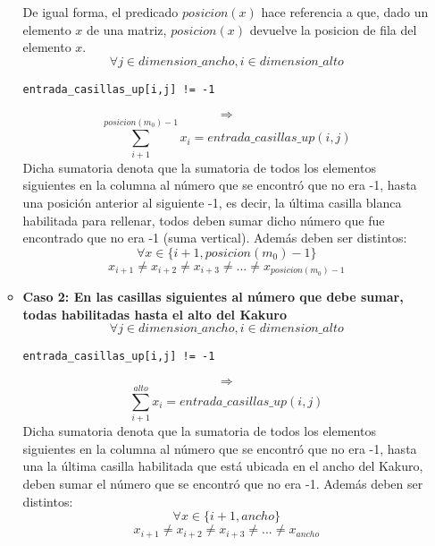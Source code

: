 \documentclass[12pt]{article}
\begin{document}
\begin{itemize}
\begin{itemize}
\\ \\
De igual forma, el predicado $posicion(x)$ hace referencia a que, dado un elemento $x$ de una matriz, $posicion(x)$ devuelve la posicion de fila del elemento $x$.
\begin{equation*}
\forall j \in dimension\_ancho, i \in dimension\_alto
\end{equation*}
\begin{verbatim}
entrada_casillas_up[i,j] != -1
\end{verbatim}
\begin{equation*}
\Rightarrow
\end{equation*}
\begin{equation*}
\sum_{i+1}^{posicion(m_0)-1} x_{i} = entrada\_casillas\_up(i,j)
\end{equation*}
Dicha sumatoria denota que la sumatoria de todos los elementos siguientes en la columna al número que se encontró que no era -1, hasta una posición anterior al siguiente -1, es decir, la última casilla blanca habilitada para rellenar, todos deben sumar dicho número que fue encontrado que no era -1 (suma vertical). Además deben ser distintos:
\begin{equation*}
\forall x \in \{i+1,posicion(m_0)-1\}
\end{equation*}
\begin{equation*}
x_{i+1} \neq x_{i+2} \neq x_{i+3} \neq ... \neq x_{posicion(m_0)-1}
\end{equation*}
\item \textbf{Caso 2: En las casillas siguientes al número que debe sumar, todas habilitadas hasta el alto del Kakuro}
\begin{equation*}
\forall j \in dimension\_ancho, i \in dimension\_alto
\end{equation*}
\begin{verbatim}
entrada_casillas_up[i,j] != -1
\end{verbatim}
\begin{equation*}
\Rightarrow
\end{equation*}
\begin{equation*}
\sum_{i+1}^{alto} x_{i} = entrada\_casillas\_up(i,j)
\end{equation*}
Dicha sumatoria denota que la sumatoria de todos los elementos siguientes en la columna al número que se encontró que no era -1, hasta una la última casilla habilitada que está ubicada en el ancho del Kakuro, deben sumar el número que se encontró que no era -1. Además deben ser distintos:
\begin{equation*}
\forall x \in \{i+1,ancho\}
\end{equation*}
\begin{equation*}
x_{i+1} \neq x_{i+2} \neq x_{i+3} \neq ... \neq x_{ancho}
\end{equation*}
\end{itemize}
\end{itemize}
\end{document}
